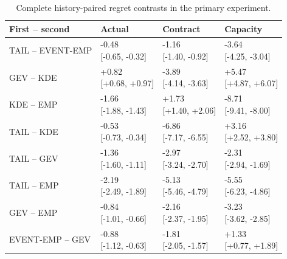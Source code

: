 \begingroup
\fontsize{8.5}{10.5}\selectfont\setlength{\tabcolsep}{3.0pt}\renewcommand{\arraystretch}{1.23}
\begin{table}[tbp]\centering
\caption{Complete history-paired regret contrasts in the primary experiment.}\label{tab:final-si-11}
\begin{tabular}{@{}llll@{}}\toprule
First -- second & Actual & Contract & Capacity\\\midrule
TAIL -- EVENT-EMP & \shortstack{-0.48\\{}[-0.65, -0.32]} & \shortstack{-1.16\\{}[-1.40, -0.92]} & \shortstack{-3.64\\{}[-4.25, -3.04]}\\
GEV -- KDE & \shortstack{+0.82\\{}[+0.68, +0.97]} & \shortstack{-3.89\\{}[-4.14, -3.63]} & \shortstack{+5.47\\{}[+4.87, +6.07]}\\
KDE -- EMP & \shortstack{-1.66\\{}[-1.88, -1.43]} & \shortstack{+1.73\\{}[+1.40, +2.06]} & \shortstack{-8.71\\{}[-9.41, -8.00]}\\
TAIL -- KDE & \shortstack{-0.53\\{}[-0.73, -0.34]} & \shortstack{-6.86\\{}[-7.17, -6.55]} & \shortstack{+3.16\\{}[+2.52, +3.80]}\\
TAIL -- GEV & \shortstack{-1.36\\{}[-1.60, -1.11]} & \shortstack{-2.97\\{}[-3.24, -2.70]} & \shortstack{-2.31\\{}[-2.94, -1.69]}\\
TAIL -- EMP & \shortstack{-2.19\\{}[-2.49, -1.89]} & \shortstack{-5.13\\{}[-5.46, -4.79]} & \shortstack{-5.55\\{}[-6.23, -4.86]}\\
GEV -- EMP & \shortstack{-0.84\\{}[-1.01, -0.66]} & \shortstack{-2.16\\{}[-2.37, -1.95]} & \shortstack{-3.23\\{}[-3.62, -2.85]}\\
EVENT-EMP -- GEV & \shortstack{-0.88\\{}[-1.12, -0.63]} & \shortstack{-1.81\\{}[-2.05, -1.57]} & \shortstack{+1.33\\{}[+0.77, +1.89]}\\

\end{tabular}
\end{table}
